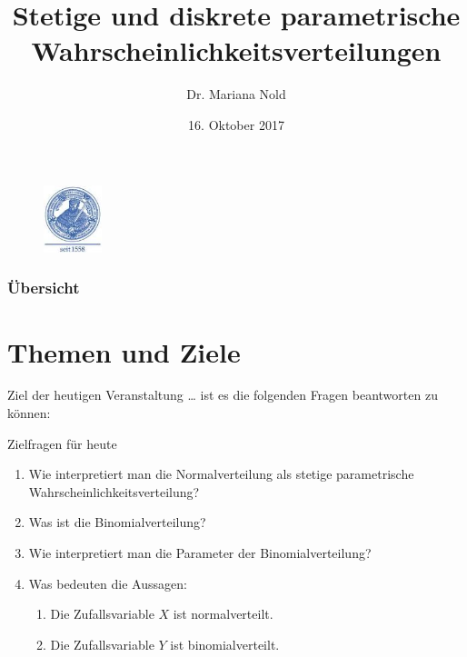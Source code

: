\documentclass[usenames,dvipsnames,handout]{beamer}
\begin{document}
\author[Dr. Mariana Nold]{Dr. Mariana Nold}
 \date{}
\title [Deskriptive und Induktive Statistik]{Stetige und diskrete 
parametrische  Wahrscheinlichkeitsverteilungen}
\date{16. Oktober 2017}
\begin{frame}
\maketitle

  \begin{figure}[ht]
 	\centering
 	      \includegraphics[width=0.15\textwidth]{index.jpeg}
 	\end{figure}
\end{frame} 

\begin{frame}
  \frametitle{Übersicht}
  \tableofcontents
\end{frame}

\section{Themen und Ziele}

\begin{frame}{Ziel der heutigen Veranstaltung \dots}
ist es die folgenden Fragen beantworten zu können:
\begin{block}{Zielfragen für heute}
\begin{enumerate}
\item{Wie interpretiert man die Normalverteilung als stetige
parametrische Wahrscheinlichkeitsverteilung?}
\item{Was ist die Binomialverteilung?}
\item{Wie interpretiert man die Parameter der Binomialverteilung?}
\item{Was bedeuten die Aussagen:}
\begin{enumerate}
\item{Die Zufallsvariable $X$ ist normalverteilt.}
\item{Die Zufallsvariable $Y$ ist binomialverteilt.}
\end{enumerate}
\end{enumerate}
\end{block}
\end{frame}
\end{document}
